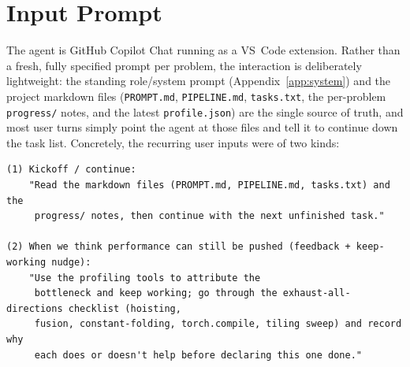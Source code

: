\documentclass[conference]{IEEEtran}
\newcommand{\mainbodyendpage}{?}
\begin{document}
\xdef\mainbodyendpage{\thepage}

\appendices

\section{Input Prompt}
\label{app:input}
The agent is GitHub Copilot Chat running as a VS~Code extension. Rather than a
fresh, fully specified prompt per problem, the interaction is deliberately
lightweight: the standing role/system prompt (Appendix~\ref{app:system}) and the
project markdown files (\texttt{PROMPT.md}, \texttt{PIPELINE.md},
\texttt{tasks.txt}, the per-problem \texttt{progress/} notes, and the latest
\texttt{profile.json}) are the single source of truth, and most user turns
simply point the agent at those files and tell it to continue down the task
list. Concretely, the recurring user inputs were of two kinds:
\begin{lstlisting}
(1) Kickoff / continue:
    "Read the markdown files (PROMPT.md, PIPELINE.md, tasks.txt) and the
     progress/ notes, then continue with the next unfinished task."

(2) When we think performance can still be pushed (feedback + keep-working nudge):
    "Use the profiling tools to attribute the
     bottleneck and keep working; go through the exhaust-all-directions checklist (hoisting,
     fusion, constant-folding, torch.compile, tiling sweep) and record why
     each does or doesn't help before declaring this one done."
\end{lstlisting}
\end{document}
